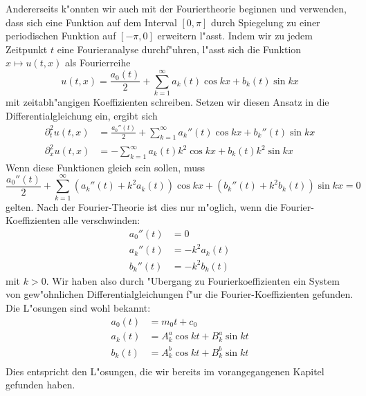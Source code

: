 Andererseits k"onnten wir auch mit der Fouriertheorie beginnen und
verwenden, dass sich eine Funktion auf dem Interval $[0,\pi]$
durch Spiegelung zu einer periodischen Funktion auf $[-\pi,0]$
erweitern l"asst. Indem wir zu jedem Zeitpunkt $t$ eine Fourieranalyse
durchf"uhren, l"asst sich die Funktion $x\mapsto u(t,x)$ als
Fourierreihe 
$$
u(t,x)=\frac{a_0(t)}2+\sum_{k=1}^\infty a_k(t)\cos kx+b_k(t)\sin kx
$$
mit zeitabh"angigen Koeffizienten schreiben.
Setzen wir diesen Ansatz in die Differentialgleichung ein, ergibt sich
\begin{align*}
\partial_t^2u(t,x)&=\frac{a_0''(t)}2
+\sum_{k=1}^\infty a_k''(t)\cos kx+b_k''(t)\sin kx\\
\partial_x^2u(t,x)&=
-\sum_{k=1}^\infty a_k(t)k^2\cos kx+b_k(t)k^2\sin kx
\end{align*}
Wenn diese Funktionen gleich sein sollen, muss
$$
\frac{a_0''(t)}2
+\sum_{k=1}^\infty (a_k''(t)+k^2a_k(t))\cos kx+(b_k''(t)+k^2b_k(t))\sin kx=0
$$
gelten. Nach der Fourier-Theorie ist dies nur m"oglich, wenn die
Fourier-Koeffizienten alle verschwinden:
\begin{align*}
a_0''(t)&=0\\
a_k''(t)&=-k^2a_k(t)\\
b_k''(t)&=-k^2b_k(t)
\end{align*}
mit $k>0$.
Wir haben also durch "Ubergang zu Fourierkoeffizienten ein System
von gew"ohnlichen Differentialgleichungen f"ur die Fourier-Koeffizienten
gefunden. Die L"osungen sind wohl bekannt:
\begin{align*}
a_0(t)&=m_0t+c_0\\
a_k(t)&=A^a_k\cos kt+B^a_k\sin kt\\
b_k(t)&=A^b_k\cos kt+B^b_k\sin kt\\
\end{align*}
Dies entspricht den L"osungen, die wir bereits im vorangegangenen
Kapitel gefunden haben.

